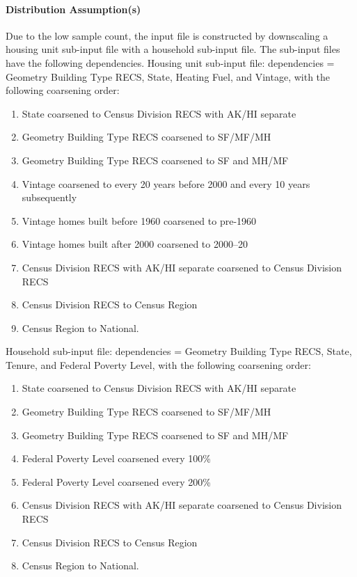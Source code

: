 \paragraph{Distribution Assumption(s)}
Due to the low sample count, the input file is constructed by downscaling a housing unit sub-input file with a household sub-input file. The sub-input files have the following dependencies. Housing unit sub-input file: dependencies = Geometry Building Type RECS, State, Heating Fuel, and Vintage, with the following coarsening order:
\begin{enumerate}
    \item State coarsened to Census Division RECS with AK/HI separate
    \item  Geometry Building Type RECS coarsened to SF/MF/MH
    \item  Geometry Building Type RECS coarsened to SF and MH/MF 
    \item  Vintage coarsened to every 20 years before 2000 and every 10 years subsequently
    \item Vintage homes built before 1960 coarsened to pre-1960 
    \item  Vintage homes built after 2000 coarsened to 2000--20
    \item Census Division RECS with AK/HI separate coarsened to Census Division RECS 
    \item Census Division RECS to Census Region
    \item Census Region to National. 
\end{enumerate}

Household sub-input file: dependencies = Geometry Building Type RECS, State, Tenure, and Federal Poverty Level, with the following coarsening order:

\begin{enumerate}
    \item State coarsened to Census Division RECS with AK/HI separate 
    \item  Geometry Building Type RECS coarsened to SF/MF/MH 
    \item  Geometry Building Type RECS coarsened to SF and MH/MF
    \item  Federal Poverty Level coarsened every 100\% 
    \item Federal Poverty Level coarsened every 200\% 
    \item  Census Division RECS with AK/HI separate coarsened to Census Division RECS
    \item Census Division RECS to Census Region
    \item Census Region to National. 
\end{enumerate}

